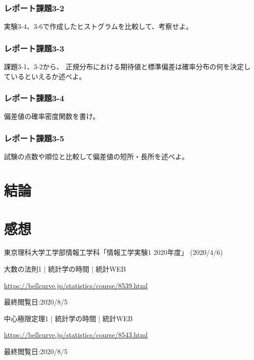 \documentclass[12pt]{jarticle}
\begin{document}
\subsubsection*{レポート課題3-2}
\begin{shadebox}
    実験3-4、3-6で作成したヒストグラムを比較して、考察せよ。
\end{shadebox}

\subsubsection*{レポート課題3-3}
\begin{shadebox}
    課題3-1、3-2から、
    正規分布における期待値と標準偏差は確率分布の何を決定しているといえるか述べよ。
\end{shadebox}
\subsubsection*{レポート課題3-4}
\begin{shadebox}
    偏差値の確率密度関数を書け。
\end{shadebox}
\subsubsection*{レポート課題3-5}
\begin{shadebox}
    試験の点数や順位と比較して偏差値の短所・長所を述べよ。
\end{shadebox}

\clearpage

\section{結論}


\section{感想}


\begin{thebibliography}{99}
    \label{sannkoubunnkenn_chapter}
    東京理科大学工学部情報工学科「情報工学実験1 2020年度」
    (2020/4/6)

    大数の法則1 | 統計学の時間 | 統計WEB

    \url{https://bellcurve.jp/statistics/course/8539.html}

    最終閲覧日:2020/8/5

    中心極限定理1 | 統計学の時間 | 統計WEB

    \url{https://bellcurve.jp/statistics/course/8543.html}

    最終閲覧日:2020/8/5

\end{thebibliography}

\appendix
\end{document}
